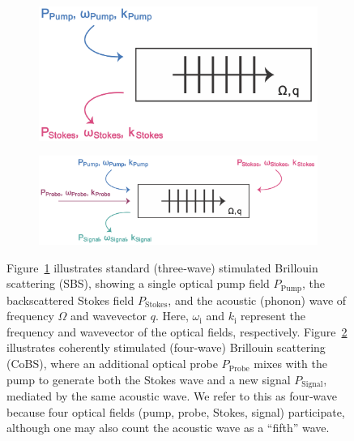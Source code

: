 \begin{figure}[t]
    \centering
    \begin{subfigure}[b]{0.37\textwidth}
        \centering
        \includegraphics[width=\textwidth]{figs/3-CoBS/SBS Illustrator Diagram.png}
        \caption{}
        \label{fig:CoBS:SBSDiagram}
    \end{subfigure}
    \hfill
    \begin{subfigure}[b]{0.54\textwidth}
        \centering
        \includegraphics[width=\textwidth]{figs/3-CoBS/4-Wave-Brillouin-Scattering.png}
        \caption{}
        \label{fig:CoBS:4-Wave-Brillouin-Scattering}
    \end{subfigure}
    \caption{Figure~\ref{fig:CoBS:SBSDiagram} illustrates standard (three‐wave) stimulated Brillouin scattering (\acs{SBS}), showing a single optical pump field \(P_{\mathrm{Pump}}\), the backscattered Stokes field \(P_{\mathrm{Stokes}}\), and the acoustic (phonon) wave of frequency \(\Omega\) and wavevector \(q\). Here, \(\omega_{\mathrm{i}}\) and \(k_{\mathrm{i}}\) represent the frequency and wavevector of the optical fields, respectively. Figure~\ref{fig:CoBS:4-Wave-Brillouin-Scattering} illustrates coherently stimulated (four‐wave) Brillouin scattering (\acs{CoBS}), where an additional optical probe \(P_{\mathrm{Probe}}\) mixes with the pump to generate both the Stokes wave and a new signal \(P_{\mathrm{Signal}}\), mediated by the same acoustic wave. We refer to this as four‐wave because four optical fields (pump, probe, Stokes, signal) participate, although one may also count the acoustic wave as a “fifth” wave.}
    \label{fig:CoBS:SBSvsCoBSDiagrams}
\end{figure}

